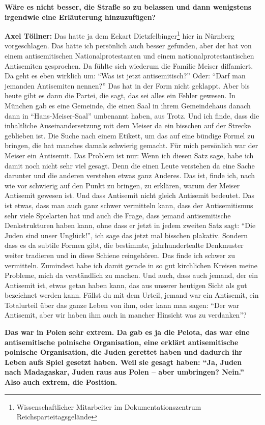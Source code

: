 \textbf{Wäre es nicht besser, die Straße so zu belassen und dann wenigstens irgendwie eine Erläuterung hinzuzufügen?} 

\textbf{Axel Töllner:} Das hatte ja dem Eckart Dietzfelbinger\footnote{Wissenschaftlicher Mitarbeiter im Dokumentationszentrum Reichsparteitagsgelände} hier in Nürnberg vorgeschlagen. Das hätte ich persönlich auch besser gefunden, aber der hat von einem antisemitischen Nationalprotestanten und einem nationalprotestantischen Antisemiten gesprochen. Da fühlte sich wiederum die Familie Meiser diffamiert. Da geht es eben wirklich um: "`Was ist jetzt antisemitisch?"' Oder: "`Darf man jemanden Antisemiten nennen?"' Das hat in der Form nicht geklappt. Aber bis heute gibt es dann die Partei, die sagt, das sei alles ein Fehler gewesen. In München gab es eine Gemeinde, die einen Saal in ihrem Gemeindehaus danach dann in "`Hans-Meiser-Saal"' umbenannt haben, aus Trotz. Und ich finde, dass die inhaltliche Auseinandersetzung mit dem Meiser da ein bisschen auf der Strecke geblieben ist. Die Suche nach einem Etikett, um das auf eine bündige Formel zu bringen, die hat manches damals schwierig gemacht. Für mich persönlich war der Meiser ein Antisemit. 
Das Problem ist nur: Wenn ich diesen Satz sage, habe ich damit noch nicht sehr viel gesagt. Denn die einen Leute verstehen da eine Sache darunter und die anderen verstehen etwas ganz Anderes. Das ist, finde ich, nach wie vor schwierig auf den Punkt zu bringen, zu erklären, warum der Meiser Antisemit gewesen ist. Und dass Antisemit nicht gleich Antisemit bedeutet. Das ist etwas, dass man auch ganz schwer vermitteln kann, dass der Antisemitismus sehr viele Spielarten hat und auch die Frage, dass jemand antisemitische Denkstrukturen haben kann, ohne dass er jetzt in jedem zweiten Satz sagt: "`Die Juden sind unser Unglück!"', ich sage das jetzt mal bisschen plakativ. Sondern dass es da subtile Formen gibt, die bestimmte, jahrhundertealte Denkmuster weiter tradieren und in diese Schiene reingehören. Das finde ich schwer zu vermitteln. Zumindest habe ich damit gerade in so gut kirchlichen Kreisen meine Probleme, mich da verständlich zu machen. Und auch, dass auch jemand, der ein Antisemit ist, etwas getan haben kann, das aus unserer heutigen Sicht als gut bezeichnet werden kann. Fällst du mit dem Urteil, jemand war ein Antisemit, ein Totalurteil über das ganze Leben von ihm, oder kann man sagen: "`Der war Antisemit, aber wir haben ihm auch in mancher Hinsicht was zu verdanken"'? 
 
\textbf{Das war in Polen sehr extrem. Da gab es ja die Pelota, das war eine antisemitische polnische Organisation, eine erklärt antisemitische polnische Organisation, die Juden gerettet haben und dadurch ihr Leben aufs Spiel gesetzt haben. Weil sie gesagt haben: "`Ja, Juden nach Madagaskar, Juden raus aus Polen – aber umbringen? Nein."' Also auch extrem, die Position.} 

